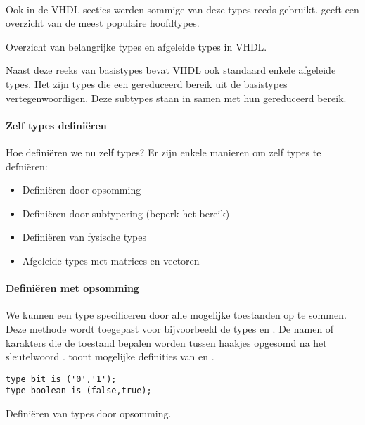 \paragraph{}
Ook in de VHDL-secties werden sommige van deze types reeds gebruikt.  geeft een overzicht van de meest populaire hoofdtypes.
\begin{table}[hbt]
\centering
{}
\caption{Overzicht van belangrijke types en afgeleide types in VHDL.}
\end{table}
Naast deze reeks van basistypes bevat VHDL ook standaard enkele afgeleide types. Het zijn types die een gereduceerd bereik uit de basistypes vertegenwoordigen. Deze subtypes staan in  samen met hun gereduceerd bereik.
\paragraph{Zelf types defini\"eren} Hoe defini\"eren we nu zelf types? Er zijn enkele manieren om zelf types te defni\"eren:
\begin{itemize}
 \item Defini\"eren door opsomming
 \item Defini\"eren door subtypering (beperk het bereik)
 \item Defini\"eren van fysische types
 \item Afgeleide types met matrices en vectoren
\end{itemize}
\paragraph{Defini\"eren met opsomming} We kunnen een type specificeren door alle mogelijke toestanden op te sommen. Deze methode wordt toegepast voor bijvoorbeeld de types  en . De namen of karakters die de toestand bepalen worden tussen haakjes opgesomd na het sleutelwoord .  toont mogelijke definities van  en .
\begin{vhdlcode}[hbt]
\begin{lstlisting}
type bit is ('0','1');
type boolean is (false,true);
\end{lstlisting}
\caption{Defini\"eren van types door opsomming.}
\label{lst:constante}
\end{vhdlcode}

